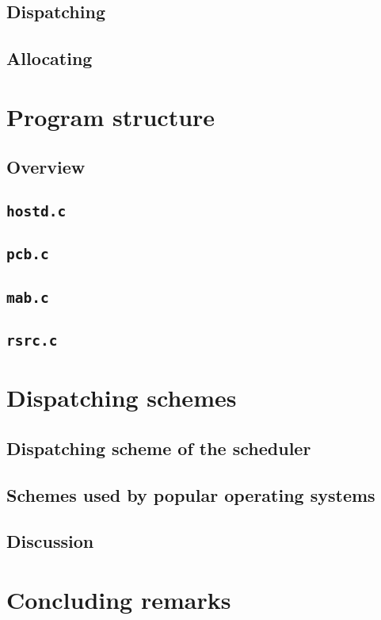 \documentclass[12pt]{article}
\begin{document}
\subsection{Dispatching}

\subsection{Allocating}

\section{Program structure}

\subsection{Overview}

\subsection{\tt{hostd.c}}

\subsection{\tt{pcb.c}}

\subsection{\tt{mab.c}}

\subsection{\tt{rsrc.c}}

\section{Dispatching schemes}

\subsection{Dispatching scheme of the scheduler}

\subsection{Schemes used by popular operating systems}

\subsection{Discussion}

\section{Concluding remarks}



\end{document}
